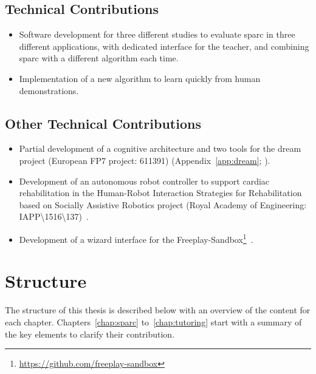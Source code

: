 \subsection{Technical Contributions}

\begin{itemize}
	\item Software development for three different studies to evaluate \gls{sparc} in three different applications, with dedicated interface for the teacher, and combining \gls{sparc} with a different algorithm each time.
	\item Implementation of a new algorithm to learn quickly from human demonstrations.
\end{itemize}

\subsection{Other Technical Contributions}

\begin{itemize}
	\item Partial development of a cognitive architecture and two tools for the \acrshort{dream} project (European FP7 project: 611391) (Appendix~\ref{app:dream}; \citealt{esteban2017build}).
	\item Development of an autonomous robot controller to support cardiac rehabilitation in the Human-Robot Interaction Strategies for Rehabilitation based on Socially Assistive Robotics project (Royal Academy of Engineering: IAPP\textbackslash1516\textbackslash137)~\citep{lara2017human,casas2018social}.
	\item Development of a wizard interface for the Freeplay-Sandbox\footnote{\url{https://github.com/freeplay-sandbox}}~\citep{lemaignan2018pinsoro,wallbridge2018spatial}.
\end{itemize}
	
\section{Structure}\label{sec:intro_struct}

The structure of this thesis is described below with an overview of the content for each chapter. Chapters~\ref{chap:sparc} to~\ref{chap:tutoring} start with a summary of the key elements to clarify their contribution.

